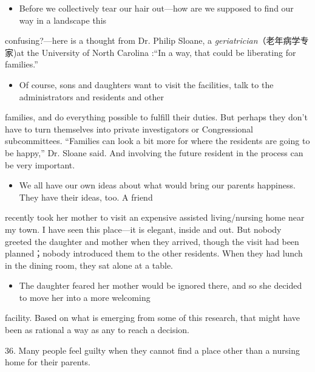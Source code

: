 \documentclass[UTF8,11pt]{ctexart}
\begin{document}
\begin{itemize}[leftmargin=2em,itemsep=.2em,topsep=.4em]\item[K.] Before we collectively tear our hair out—how are we supposed to find our way in a landscape this
\end{itemize}

confusing?—here is a thought from Dr. Philip Sloane, a\textit{ geriatrician}（老年病学专家)at the University of North Carolina :“In a way, that could be liberating for families.”


\begin{itemize}[leftmargin=2em,itemsep=.2em,topsep=.4em]\item[L.] Of course, sons and daughters want to visit the facilities, talk to the administrators and residents and other
\end{itemize}

families, and do everything possible to fulfill their duties. But perhaps they don't have to turn themselves into private investigators or Congressional subcommittees. “Families can look a bit more for where the residents are going to be happy,” Dr. Sloane said. And involving the future resident in the process can be very important.


\begin{itemize}[leftmargin=2em,itemsep=.2em,topsep=.4em]\item[M.] We all have our own ideas about what would bring our parents happiness. They have their ideas, too. A friend
\end{itemize}

recently took her mother to visit an expensive assisted living/nursing home near my town. I have seen this place—it is elegant, inside and out. But nobody greeted the daughter and mother when they arrived, though the visit had been planned；nobody introduced them to the other residents. When they had lunch in the dining room, they sat alone at a table.


\begin{itemize}[leftmargin=2em,itemsep=.2em,topsep=.4em]\item[N.] The daughter feared her mother would be ignored there, and so she decided to move her into a more welcoming
\end{itemize}

facility. Based on what is emerging from some of this research, that might have been as rational a way as any to reach a decision.


36. Many people feel guilty when they cannot find a place other than a nursing home for their parents.
\end{document}
